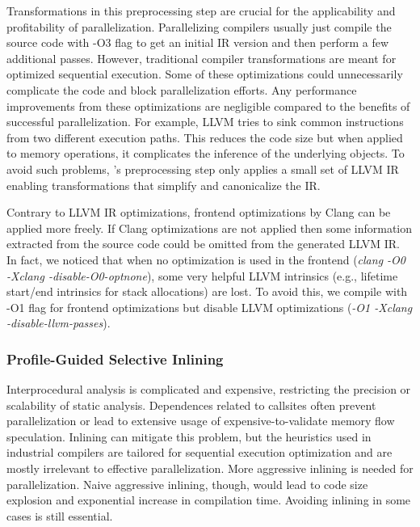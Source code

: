 Transformations in this preprocessing step are crucial for the
applicability and profitability of parallelization.
%
Parallelizing compilers usually just compile the source code with -O3
flag to get an initial IR version and then perform a few additional
passes.
%
However, traditional compiler transformations are meant for optimized
sequential execution.
%
Some of these optimizations could unnecessarily complicate the code
and block parallelization efforts.
%
Any performance improvements from these optimizations are negligible
compared to the benefits of successful parallelization.
%
For example, LLVM tries to sink common instructions from two different
execution paths. This reduces the code size but when applied to memory
operations, it complicates the inference of the underlying objects.
%
To avoid such problems, \namensp 's preprocessing step only applies a
small set of LLVM IR enabling transformations that simplify and
canonicalize the IR.

Contrary to LLVM IR optimizations, frontend optimizations by Clang can
be applied more freely.
%
If Clang optimizations are not applied then some information extracted
from the source code could be omitted from the generated LLVM IR.  In
fact, we noticed that when no optimization is used in the frontend
(\textit{clang -O0 -Xclang -disable-O0-optnone}), some very helpful
LLVM intrinsics (e.g., lifetime start/end intrinsics for stack
allocations) are lost.  To avoid this, we compile with -O1 flag for
frontend optimizations but disable LLVM optimizations (\textit{-O1
-Xclang -disable-llvm-passes}).


\subsubsection{Profile-Guided Selective Inlining}

Interprocedural analysis is complicated and expensive, restricting the
precision or scalability of static analysis.
%
Dependences related to callsites often prevent parallelization or lead
to extensive usage of expensive-to-validate memory flow speculation.
%
Inlining can mitigate this problem, but the heuristics used in
industrial compilers are tailored for sequential execution
optimization and are mostly irrelevant to effective parallelization.
%
%
More aggressive inlining is needed for parallelization. Naive
aggressive inlining, though, would lead to code size explosion and
exponential increase in compilation time. Avoiding inlining in some
cases
is still essential.
%

